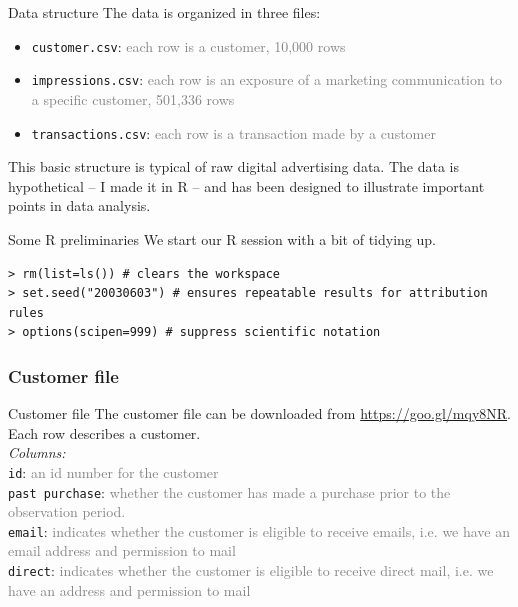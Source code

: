 \documentclass[10pt, aspectratio=169]{beamer}
\begin{document}
\begin{frame}{Data structure}
The data is organized in three files: \\
\begin{itemize}
\item \texttt{customer.csv}: \textcolor{gray}{each row is a customer, 10,000 rows}
\item \texttt{impressions.csv}: \textcolor{gray}{each row is an exposure of a marketing communication to a specific customer, 501,336 rows}
\item \texttt{transactions.csv}: \textcolor{gray}{each row is a transaction made by a customer}
\end{itemize}
\pause This basic structure is typical of raw digital advertising data. The data is hypothetical -- I made it in R -- and has been designed to illustrate important points in data analysis. \\
\end{frame}

\begin{frame}[fragile]{Some R preliminaries}
We start our R session with a bit of tidying up. 
\begin{lstlisting}
> rm(list=ls()) # clears the workspace
> set.seed("20030603") # ensures repeatable results for attribution rules
> options(scipen=999) # suppress scientific notation
\end{lstlisting}
\end{frame}

\subsubsection{Customer file}

\begin{frame}[fragile]{\alert{Customer file}}
The customer file can be downloaded from \href{https://goo.gl/mqy8NR}{https://goo.gl/mqy8NR}. Each row describes a customer. \\
\bigskip
\emph{Columns:} \\
\verb|id|: \textcolor{gray}{an id number for the customer}\\
\verb|past purchase|: \textcolor{gray}{whether the customer has made a purchase prior to the observation period.} \\
\verb|email|: \textcolor{gray}{indicates whether the customer is eligible to receive emails, i.e. we have an email address and permission to mail}\\
\verb|direct|: \textcolor{gray}{indicates whether the customer is eligible to receive direct mail, i.e. we have an address and permission to mail}\\
\end{frame}
\end{document}
